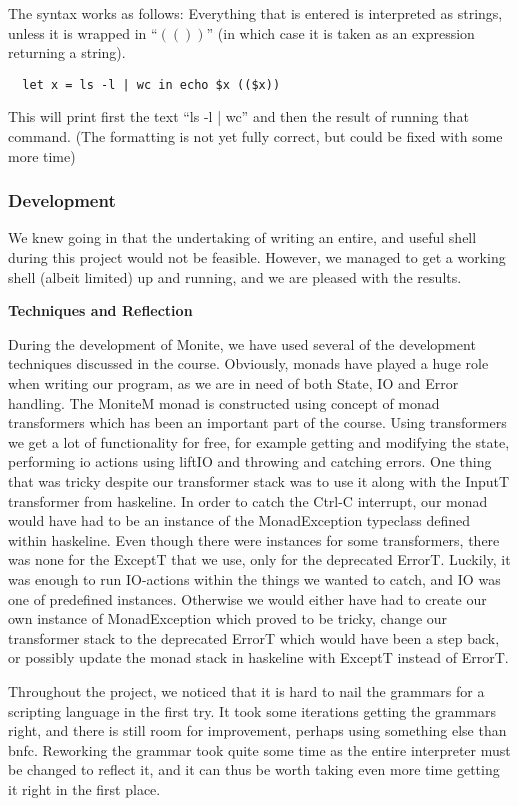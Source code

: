 \documentclass[11pt,a4paper]{article}
\begin{document}
The syntax works as follows: Everything that is entered is interpreted as
strings, unless it is wrapped in ``$\left( \left(  \right) \right)$'' (in which
case it is taken as an expression returning a string).

\begin{verbatim}
  let x = ls -l | wc in echo $x (($x))
\end{verbatim}

This will print first the text ``ls -l | wc'' and then the result of running
that command. (The formatting is not yet fully correct, but could be fixed with
some more time)

\subsubsection{Development}

We knew going in that the undertaking of writing an entire, and useful shell
during this project would not be feasible. However, we managed to get a working
shell (albeit limited) up and running, and we are pleased with the results.

\textbf{Techniques and Reflection}

During the development of Monite, we have used several of the development
techniques discussed in the course. Obviously, monads have played a huge role
when writing our program, as we are in need of both State, IO and Error
handling. The MoniteM monad is constructed using concept of monad transformers
which has been an important part of the course. Using transformers we get a lot
of functionality for free, for example getting and modifying the state,
performing io actions using liftIO and throwing and catching errors. One thing
that was tricky despite our transformer stack was to use it along with the
InputT transformer from haskeline. In order to catch the Ctrl-C interrupt, our
monad would have had to be an instance of the MonadException typeclass defined
within haskeline. Even though there were instances for some transformers, there
was none for the ExceptT that we use, only for the deprecated ErrorT. Luckily,
it was enough to run IO-actions within the things we wanted to catch, and IO was
one of predefined instances. Otherwise we would either have had to create our
own instance of MonadException which proved to be tricky, change our transformer
stack to the deprecated ErrorT which would have been a step back, or possibly
update the monad stack in haskeline with ExceptT instead of ErrorT.

Throughout the project, we noticed that it is hard to nail the grammars for a
scripting language in the first try. It took some iterations getting the
grammars right, and there is still room for improvement, perhaps using something
else than bnfc. Reworking the grammar took quite some time as the entire
interpreter must be changed to reflect it, and it can thus be worth taking even
more time getting it right in the first place.
\end{document}
